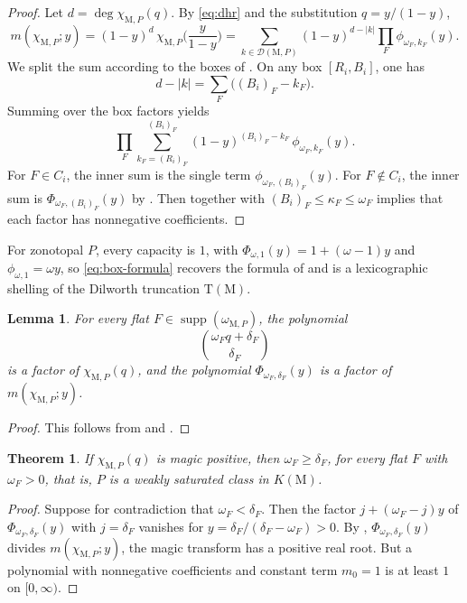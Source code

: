 \documentclass[11pt,a4paper,reqno]{amsart}
\theoremstyle{results}
\newtheorem{lemma}[thm]{Lemma}
\theoremstyle{definitions}
\newcommand{\M}{\mathrm{M}}
\newtheorem{theorem}[thm]{Theorem}
\DeclareMathOperator{\supp}{supp}
\newcommand{\DT}{\mathrm{T}}      %
\newcommand{\capa}{\kappa}   %
\newcommand{\dem}{\delta}    %
\newcommand{\DHR}{\mathcal{D}}
\begin{document}
\begin{proof}
  Let $d = \deg \chi_{\M, P}(q)$. By \eqref{eq:dhr} and the substitution $q = y/(1-y)$,
  \[
    m(\chi_{\M,P}; y) = (1-y)^d\,\chi_{\M,P}\Big(\frac{y}{1-y}\Big)
         = \sum_{k \in \DHR(\M, P)} (1-y)^{d - |k|}\prod_F \phi_{\omega_F, k_F}(y).
  \]
  We split the sum according to the boxes of . On any box $[R_i, B_i]$, one
  has
  \[d - |k| = \sum_F\big((B_i)_F - k_F\big). 
  \] Summing over the box factors yields
  \[
  \prod_F \sum_{k_F = (R_i)_F}^{(B_i)_F}(1-y)^{(B_i)_F - k_F} \, \phi_{\omega_F,k_F}(y).
  \]
  For $F \in C_i$, the inner sum is the single term $\phi_{\omega_F,(B_i)_F}(y)$. For
  $F \notin C_i$, the inner sum is $\Phi_{\omega_F, (B_i)_F}(y)$ by .
  Then  together with $(B_i)_F \leqslant \capa_F \leqslant \omega_F$ implies that each factor has nonnegative coefficients.
\end{proof}

For zonotopal $P$, every capacity is $1$, with $\Phi_{\omega, 1}(y) = 1 + (\omega-1)y$ and
$\phi_{\omega,1} = \omega y$, so \eqref{eq:box-formula} recovers the formula of
 and  is a lexicographic shelling of the Dilworth truncation
$\DT(\M)$. 

\begin{lemma}\label{lem:forced}
  For every flat $F \in \supp(\omega_{\M, P})$, the polynomial
  \[
  \binom{\omega_F q + \dem_F}{\dem_F}
  \] is a factor of $\chi_{\M,P}(q)$, and the polynomial $\Phi_{\omega_F, \dem_F}(y)$ is a factor of $m(\chi_{\M,P}; y)$.
\end{lemma}

\begin{proof}
  This follows from  and . 
\end{proof}

\begin{theorem}\label{thm:necessary}
  If $\chi_{\M,P}(q)$ is magic positive, then $\omega_F \geqslant \dem_F$, for every flat $F$ with
  $\omega_F > 0$, that is, $P$ is a weakly saturated class in $K(\M)$.
\end{theorem}

\begin{proof}
  Suppose for contradiction that $\omega_F < \dem_F$. Then the factor $j + (\omega_F - j)y$ of $\Phi_{\omega_F, \dem_F}(y)$
  with $j = \dem_F$ vanishes for $y = \dem_F/(\dem_F - \omega_F) > 0$.  By
  , $\Phi_{\omega_F, \dem_F}(y)$ divides $m(\chi_{\M,P}; y)$, the
  magic transform has a positive real root.  But a polynomial with nonnegative
  coefficients and constant term $m_0 = 1$ is at least $1$ on $[0, \infty)$.
\end{proof}
\end{document}
